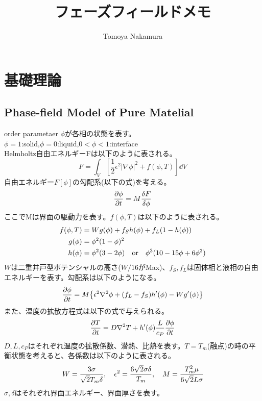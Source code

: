 \documentclass[twocolumn,landscape]{ltjsarticle}
\author{Tomoya Nakamura}
\begin{document}
\title{フェーズフィールドメモ}
\maketitle

\section{基礎理論}
  \subsection{Phase-field Model of Pure Matelial}
  order parametaer $\phi$が各相の状態を表す。\\
  $\phi=1$:solid,$\phi=0$:liquid,$0<\phi<1$:interface\\
  Helmholtz自由エネルギーFは以下のように表される。
  \begin{equation}
    F=\int_V\left[\frac{1}{2}\epsilon^2|\nabla\phi|^2+f(\phi,T)\right]\dd{V}
  \end{equation}
  自由エネルギー$F[\phi]$の勾配系(以下の式)を考える。
  \begin{equation}
    \pdv{\phi}{t}=M\frac{\delta F}{\delta \phi}
  \end{equation}
  ここでMは界面の駆動力を表す。$f(\phi,T)$は以下のように表される。
  \begin{equation}
    \begin{split}
      f(\phi,T)&=W g(\phi)+f_S h(\phi)+f_L(1-h(\phi))\\
      g(\phi)&=\phi^2(1-\phi)^2\\
      h(\phi)&=\phi^2(3-2\phi)\qq{or}\phi^3(10-15\phi+6\phi^2)
    \end{split}    
  \end{equation}
  $W$は二重井戸型ポテンシャルの高さ($W/16$がMax)、$f_S,f_L$は固体相と液相の自由エネルギーを表す。勾配系は以下のようになる。
  \begin{equation}
    \begin{split}
      \pdv{\phi}{t}&=M\qty{\epsilon^2\laplacian\phi+(f_L-f_S)h'(\phi)-Wg'(\phi)}\\
    \end{split}    
  \end{equation}
  また、温度の拡散方程式は以下の式で与えられる。
  \begin{equation}
    \pdv{T}{t}=D\laplacian T+h'(\phi)\frac{L}{c_P}\pdv{\phi}{t}
  \end{equation}
  $D,L,c_P$はそれぞれ温度の拡散係数、潜熱、比熱を表す。$T=T_m$(融点)の時の平衡状態を考えると、各係数は以下のように表される。
  \begin{equation}
    W=\frac{3\sigma}{\sqrt{2}T_m\delta}\qc \epsilon^2=\frac{6\sqrt{2}\sigma\delta}{T_m}\qc M=\frac{T_m^2\mu}{6\sqrt{2}L\sigma}
  \end{equation}
  $\sigma,\delta$はそれぞれ界面エネルギー、界面厚さを表す。
\end{document}
